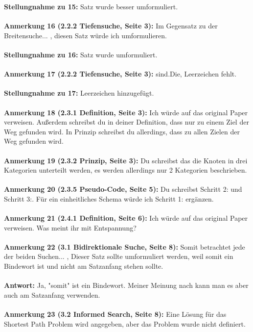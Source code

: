 \documentclass[a4paper,12pt]{book}
\begin{document}
\textbf{Stellungnahme zu 15:}
Satz wurde besser umformuliert.
\\ \\
\textbf{Anmerkung 16 (2.2.2 Tiefensuche, Seite 3):}
\grqq Im Gegensatz zu der Breitensuche... \glqq, diesen Satz würde ich umformulieren.
\\ \\
\textbf{Stellungnahme zu 16:}
Satz wurde umformuliert.
\\ \\
\textbf{Anmerkung 17 (2.2.2 Tiefensuche, Seite 3):}
\grqq sind.Die\grqq, Leerzeichen fehlt.
\\ \\
\textbf{Stellungnahme zu 17:}
Leerzeichen hinzugefügt.
\\ \\
\textbf{Anmerkung 18 (2.3.1 Definition, Seite 3):}
Ich würde auf das original Paper verweisen. Außerdem schreibst du in deiner Definition, dass nur zu einem Ziel der Weg gefunden wird. In Prinzip schreibst du allerdings, dass zu allen Zielen der Weg gefunden wird. 
\\ \\
\textbf{Anmerkung 19 (2.3.2 Prinzip, Seite 3):}
Du schreibst das die Knoten in drei Kategorien unterteilt werden, es werden allerdings nur 2 Kategorien beschrieben.
\\ \\
\textbf{Anmerkung 20 (2.3.5 Pseudo-Code, Seite 5):}
Du schreibst Schritt 2: und Schritt 3:. Für ein einheitliches Schema würde ich Schritt 1: ergänzen.
\\ \\
\textbf{Anmerkung 21 (2.4.1 Definition, Seite 6):}
Ich würde auf das original Paper verweisen. 
Was meint ihr mit Entspannung?
\\ \\
\textbf{Anmerkung 22 (3.1 Bidirektionale Suche, Seite 8):}
\grqq Somit betrachtet jede der beiden Suchen... \glqq{}, Dieser Satz sollte umformuliert werden, weil somit ein Bindewort ist und nicht am Satzanfang stehen sollte. 
\\ \\
\textbf{Antwort:}
Ja, "somit" ist ein Bindewort. Meiner Meinung nach kann man es aber auch am Satzanfang verwenden.
\\ \\
\textbf{Anmerkung 23 (3.2 Informed Search, Seite 8):}
Eine Lösung für das Shortest Path Problem wird angegeben, aber das Problem wurde nicht definiert.
\\ \\
\end{document}
